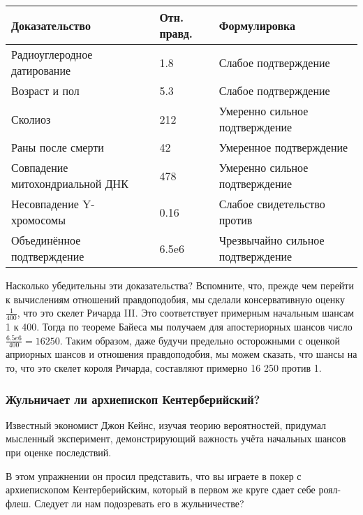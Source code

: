 \documentclass[11pt,a4paper]{article}
\begin{document}
\begin{longtable}[]{@{}lll@{}}
\toprule
Доказательство & Отн. правд. & Формулировка \\
\midrule
\endhead
Радиоуглеродное датирование & 1.8 & Слабое подтверждение \\
Возраст и пол & 5.3 & Слабое подтверждение \\
Сколиоз & 212 & Умеренно сильное подтверждение \\
Раны после смерти & 42 & Умеренное подтверждение \\
Совпадение митохондриальной ДНК & 478 & Умеренно сильное
подтверждение \\
Несовпадение Y-хромосомы & 0.16 & Слабое свидетельство против \\
Объединённое подтверждение & 6.5e6 & Чрезвычайно сильное
подтверждение \\
\bottomrule
\end{longtable}

    Насколько убедительны эти доказательства? Вспомните, что, прежде чем
перейти к вычислениям отношений правдоподобия, мы сделали консервативную
оценку \(\frac{1}{400}\), что это скелет Ричарда III. Это соответствует
примерным начальным шансам 1 к 400. Тогда по теореме Байеса мы получаем
для апостериорных шансов число \(\frac{6.5e6}{400} = 16250\). Таким
образом, даже будучи предельно осторожными с оценкой априорных шансов и
отношения правдоподобия, мы можем сказать, что шансы на то, что это
скелет короля Ричарда, составляют примерно 16 250 против 1.

    \hypertarget{ux436ux443ux43bux44cux43dux438ux447ux430ux435ux442-ux43bux438-ux430ux440ux445ux438ux435ux43fux438ux441ux43aux43eux43f-ux43aux435ux43dux442ux435ux440ux431ux435ux440ux438ux439ux441ux43aux438ux439}{%
\subsubsection{Жульничает ли архиепископ
Кентерберийский?}\label{ux436ux443ux43bux44cux43dux438ux447ux430ux435ux442-ux43bux438-ux430ux440ux445ux438ux435ux43fux438ux441ux43aux43eux43f-ux43aux435ux43dux442ux435ux440ux431ux435ux440ux438ux439ux441ux43aux438ux439}}

    Известный экономист Джон Кейнс, изучая теорию вероятностей, придумал
мысленный эксперимент, демонстрирующий важность учёта начальных шансов
при оценке последствий.

В этом упражнении он просил представить, что вы играете в покер с
архиепископом Кентерберийским, который в первом же круге сдает себе
роял-флеш. Следует ли нам подозревать его в жульничестве?
\end{document}
